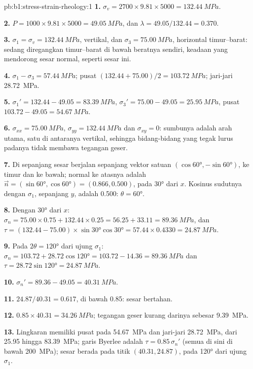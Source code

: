 \begin{solution}{pb:b1:stress-strain-rheology:1}
\textbf{1.} $\sigma_v = 2700\times9.81\times5000 = \qty{132.44}{MPa}$.

\textbf{2.} $P = 1000\times9.81\times5000 = \qty{49.05}{MPa}$, dan
$\lambda = 49.05/132.44 = 0.370$.

\textbf{3.} $\sigma_1 = \sigma_v = \qty{132.44}{MPa}$, vertikal, dan
$\sigma_3 = \qty{75.00}{MPa}$, horizontal timur--barat:  sedang diregangkan timur--barat di bawah
beratnya sendiri, keadaan yang mendorong sesar normal, seperti sesar ini.

\textbf{4.} $\sigma_1 - \sigma_3 = \qty{57.44}{MPa}$; pusat
$(132.44 + 75.00)/2 = \qty{103.72}{MPa}$; jari-jari \qty{28.72}{MPa}.

\textbf{5.} $\sigma_1' = 132.44 - 49.05 = \qty{83.39}{MPa}$, $\sigma_3' =
75.00 - 49.05 = \qty{25.95}{MPa}$, pusat $103.72 - 49.05 = \qty{54.67}{MPa}$.

\textbf{6.} $\sigma_{xx} = \qty{75.00}{MPa}$, $\sigma_{yy} = \qty{132.44}{MPa}$
dan $\sigma_{xy} = 0$: sumbunya adalah arah utama, satu di antaranya vertikal, sehingga bidang-bidang
yang tegak lurus padanya tidak membawa tegangan geser.

\textbf{7.} Di sepanjang  sesar berjalan sepanjang vektor satuan
$(\cos\ang{60}, -\sin\ang{60})$, ke timur dan ke bawah; normal ke atasnya adalah
$\vec n = (\sin\ang{60}, \cos\ang{60}) = (0.866, 0.500)$, pada \ang{30} dari
$x$. Kosinus sudutnya dengan $\sigma_1$, sepanjang $y$, adalah
0.500: $\theta = \ang{60}$.

\textbf{8.} Dengan \ang{30} dari $x$: $\sigma_n = 75.00\times0.75 + 132.44\times0.25
= 56.25 + 33.11 = \qty{89.36}{MPa}$, dan $\tau = (132.44 - 75.00)\times
\sin\ang{30}\cos\ang{30} = 57.44\times0.4330 = \qty{24.87}{MPa}$.

\textbf{9.} Pada $2\theta = \ang{120}$ dari ujung $\sigma_1$:
$\sigma_n = 103.72 + 28.72\cos\ang{120} = 103.72 - 14.36 = \qty{89.36}{MPa}$
dan $\tau = 28.72\sin\ang{120} = \qty{24.87}{MPa}$.

\textbf{10.} $\sigma_n' = 89.36 - 49.05 = \qty{40.31}{MPa}$.

\textbf{11.} $24.87/40.31 = 0.617$, di bawah 0.85: sesar bertahan.

\textbf{12.} $0.85\times40.31 = \qty{34.26}{MPa}$; tegangan geser kurang darinya sebesar
\qty{9.39}{MPa}.

\textbf{13.} Lingkaran memiliki pusat pada \qty{54.67}{MPa} dan jari-jari
\qty{28.72}{MPa}, dari \num{25.95} hingga \qty{83.39}{MPa}; garis Byerlee adalah
$\tau = 0.85\,\sigma_n'$ (semua  di sini di bawah
\qty{200}{MPa}); sesar berada pada titik $(40.31, 24.87)$, pada \ang{120} dari
ujung $\sigma_1$.


\end{solution}
